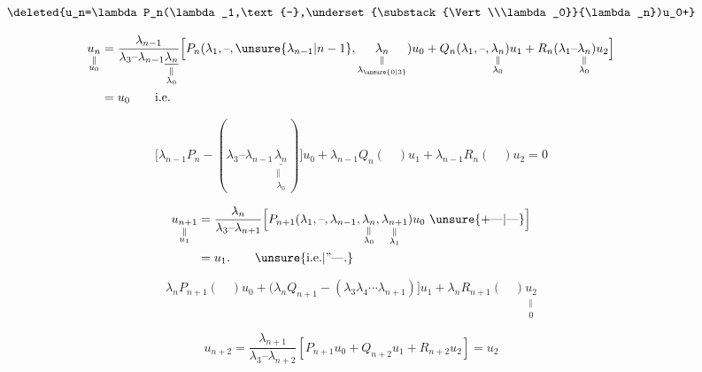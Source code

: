 
\begingroup
\makeatletter
\tagsleft@true
\makeatother

\[
\deleted{u_n=\lambda P_n(\lambda_1,\text{--},\underset{\substack{\Vert\\\lambda_0}}{\lambda_n})u_0+}
\]

{\scriptsize
\[
\begin{aligned}
\underset{\substack{\Vert\\u_0}}{u_n}
&=\frac{\lambda_{n-1}}{\lambda_3\text{--}\lambda_{n-1}\underset{\substack{\Vert\\\lambda_0}}{\underline{\lambda_n}}}
\Big[P_n(\lambda_1,\text{--},\unsure{\lambda_{n-1}|n-1},\underset{\substack{\Vert\\\lambda_{\unsure{0|3}}}}{\lambda_n})u_0+
Q_n(\lambda_1,\text{--},\underset{\substack{\Vert\\\lambda_0}}{\lambda_n})u_1+
R_n(\lambda_1\text{--}\underset{\substack{\Vert\\\lambda_0}}{\lambda_n})u_2\Big]\\
&=u_0\qquad \text{i.e.}
\end{aligned}
\]
}

{\scriptsize
\[
\boxed{\big[\lambda_{n-1}P_n-(\lambda_3\text{--}\lambda_{n-1}
\underset{\substack{\Vert\\\lambda_0}}{\underline{\lambda_n}})\big]u_0+
\lambda_{n-1}Q_n(\quad)u_1+\lambda_{n-1}R_n(\quad)u_2=0}\tag*{(1)}
\]
}

\[
\begin{aligned}
\underset{\substack{\Vert\\u_1}}{u_{n+1}}&=\frac{\lambda_n}{\lambda_3\text{--}\lambda_{n+1}}
\Big[P_{n+1}(\lambda_1,\text{--},\lambda_{n-1},\underset{\substack{\Vert\\\lambda_0}}{\lambda_n},
\underset{\substack{\Vert\\\lambda_1}}{\lambda_{n+1}})u_0\ \unsure{+\text{---}|\text{---}}\Big]\\
&=u_1.\qquad\text{\unsure{i.e.|''---.}}
\end{aligned}
\]

{\scriptsize
\[
\boxed{\lambda_nP_{n+1}(\quad)u_0+
\big(\lambda_n Q_{n+1}-(\lambda_3\lambda_4\cdots\lambda_{n+1})\big]u_1+
\lambda_n R_{n+1}(\quad)\underset{\substack{\Vert\\0}}{u_2}}\tag*{(2)}
\]
}

\[
u_{n+2}=\frac{\lambda_{n+1}}{\lambda_3\text{--}\lambda_{n+2}}
 [P_{n+1}u_0+Q_{n+2}u_1+R_{n+2}u_2]=u_2
\]

